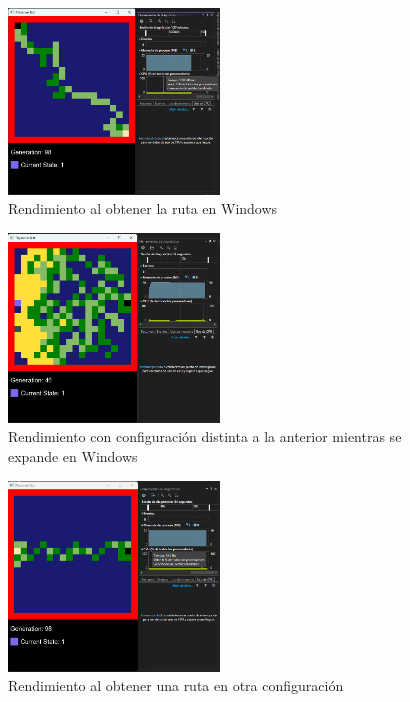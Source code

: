     \begin{figure}[htbp]
        \centering
        \includegraphics[width=0.5\textwidth]{./images/Pruebas/simulador/image023.png}
        \caption{Rendimiento al obtener la ruta en Windows}
        \label{fig:Ruta 8}
    \end{figure}
    \vskip 0.5cm
    \begin{figure}[htbp]
        \centering
        \includegraphics[width=0.5\textwidth]{./images/Pruebas/simulador/image025.png}
        \caption{Rendimiento con configuraci\'on distinta a la anterior mientras se expande en Windows}
        \label{fig:Ruta 9}
    \end{figure}
    \vskip 0.5cm
    \begin{figure}[htbp]
        \centering
        \includegraphics[width=0.5\textwidth]{./images/Pruebas/simulador/image027.png}
        \caption{Rendimiento al obtener una ruta en otra configuraci\'on}
        \label{fig:Ruta 10}
    \end{figure}
